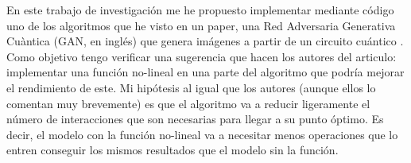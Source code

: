 En este trabajo de investigación me he propuesto implementar mediante código uno de los algoritmos que he visto en un paper, una Red Adversaria Generativa Cuàntica (GAN, en inglés) \cite{GAN2014} que genera imágenes a partir de un circuito cuántico \cite{QGAN_exp}. Como objetivo tengo verificar una sugerencia que hacen los autores del articulo: implementar una función no-lineal en una parte del algoritmo que podría mejorar el rendimiento de este. Mi hipótesis al igual que los autores (aunque ellos lo comentan muy brevemente) es que el algoritmo va a reducir ligeramente el número de interacciones que son necesarias para llegar a su punto óptimo. Es decir, el modelo con la función no-lineal va a necesitar menos operaciones que lo entren conseguir los mismos resultados que el modelo sin la función.


